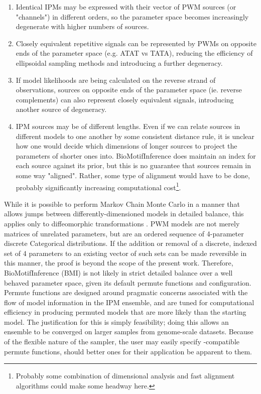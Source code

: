 \documentclass{ut-thesis}
\begin{document}
\begin{NoHyper}
\begin{enumerate}
    \item\label{identicalmodels} Identical IPMs may be expressed with their vector of PWM sources (or "channels") in different orders, so the parameter space becomes increasingly degenerate with higher numbers of sources.
    \item Closely equivalent repetitive signals can be represented by PWMs on opposite ends of the parameter space (e.g. ATAT vs TATA), reducing the efficiency of ellipsoidal sampling methods and introducing a further degeneracy.
    \item If model likelihoods are being calculated on the reverse strand of observations, sources on opposite ends of the parameter space (ie. reverse complements) can also represent closely equivalent signals, introducing another source of degeneracy.
    \item IPM sources may be of different lengths. Even if we can relate sources in different models to one another by some consistent distance rule, it is unclear how one would decide which dimensions of longer sources to project the parameters of shorter ones into. BioMotifInference does maintain an index for each source against its prior, but this is no guarantee that sources remain in some way "aligned". Rather, some type of alignment would have to be done, probably significantly increasing computational cost\footnote{Probably some combination of dimensional analysis and fast alignment algorithms could make some headway here.}.
\end{enumerate}

While it is possible to perform Markov Chain Monte Carlo in a manner that allows jumps between differently-dimensioned models in detailed balance, this applies only to diffeomorphic transformations \cite{Hastie2012}. PWM models are not merely matrices of unrelated parameters, but are an ordered sequence of 4-parameter discrete Categorical distributions. If the addition or removal of a discrete, indexed set of 4 parameters to an existing vector of such sets can be made reversible in this manner, the proof is beyond the scope of the present work. Therefore, BioMotifInference (BMI) is not likely in strict detailed balance over a well behaved parameter space, given its default permute functions and configuration. Permute functions are designed around pragmatic concerns associated with the flow of model information in the IPM ensemble, and are tuned for computational efficiency in producing permuted models that are more likely than the starting model. The justification for this is simply feasibility; doing this allows an ensemble to be converged on larger samples from genome-scale datasets. Because of the flexible nature of the sampler, the user may easily specify -compatible permute functions, should better ones for their application be apparent to them.


\end{NoHyper}
\end{document}
